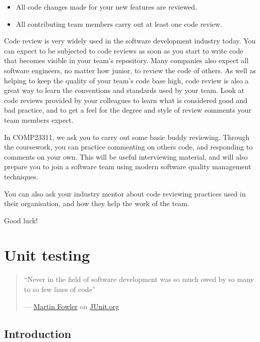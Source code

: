 \documentclass[
]{book}
\providecommand{\tightlist}{%
  \setlength{\itemsep}{0pt}\setlength{\parskip}{0pt}}
\begin{document}
\begin{itemize}
\tightlist
\item
  All code changes made for your new features are reviewed.
\item
  All contributing team members carry out at least one code review.
\end{itemize}

Code review is very widely used in the software development industry today. You can expect to be subjected to code reviews as soon as you start to write code that becomes visible in your team's repository. Many companies also expect all software engineers, no matter how junior, to review the code of others. As well as helping to keep the quality of your team's code base high, code review is also a great way to learn the conventions and standards used by your team. Look at code reviews provided by your colleagues to learn what is considered good and bad practice, and to get a feel for the degree and style of review comments your team members expect.

In COMP23311, we ask you to carry out some basic buddy reviewing. Through the coursework, you can practice commenting on others code, and responding to comments on your own. This will be useful interviewing material, and will also prepare you to join a software team using modern software quality management techniques.

You can also ask your industry mentor about code reviewing practices used in their organisation, and how they help the work of the team.

Good luck!

\hypertarget{automating}{%
\chapter{Unit testing}\label{automating}}

\begin{quote}
``Never in the field of software development was so much owed by so many to so few lines of code''

--- \href{https://en.wikipedia.org/wiki/Martin_Fowler_(software_engineer)}{Martin Fowler} on \href{https://junit.org/}{JUnit.org}
\end{quote}

\hypertarget{jintro}{%
\section{Introduction}\label{jintro}}
\end{document}
